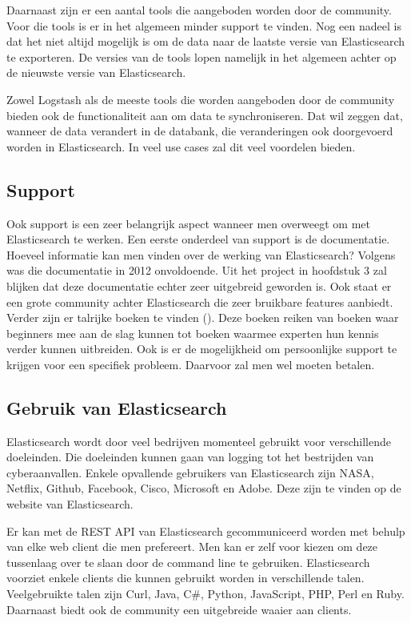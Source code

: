 Daarnaast zijn er een aantal tools die aangeboden worden door de community. Voor die tools is er in het algemeen minder support te vinden. Nog een nadeel is dat het niet altijd mogelijk is om de data naar de laatste versie van Elasticsearch te exporteren. De versies van de tools lopen namelijk in het algemeen achter op de nieuwste versie van Elasticsearch. 

Zowel Logstash als de meeste tools die worden aangeboden door de community bieden ook de functionaliteit aan om data te synchroniseren. Dat wil zeggen dat, wanneer de data verandert in de databank, die veranderingen ook doorgevoerd worden in Elasticsearch. In veel use cases zal dit veel voordelen bieden. 

\subsection{Support}

Ook support is een zeer belangrijk aspect wanneer men overweegt om met Elasticsearch te werken. Een eerste onderdeel van support is de documentatie. Hoeveel informatie kan men vinden over de werking van Elasticsearch? Volgens \textcite{Glauner2012} was die documentatie in 2012 onvoldoende. Uit het project in hoofdstuk 3 zal blijken dat deze documentatie echter zeer uitgebreid geworden is. Ook staat er een grote community achter Elasticsearch die zeer bruikbare features aanbiedt. Verder zijn er talrijke boeken te vinden (\textcite{Turner}). Deze boeken reiken van boeken waar beginners mee aan de slag kunnen tot boeken waarmee experten hun kennis verder kunnen uitbreiden. Ook is er de mogelijkheid om persoonlijke support te krijgen voor een specifiek probleem. Daarvoor zal men wel moeten betalen.

\subsection{Gebruik van Elasticsearch}
\label{subsec:gebruikES}

Elasticsearch wordt door veel bedrijven momenteel gebruikt voor verschillende doeleinden. Die doeleinden kunnen gaan van logging tot het bestrijden van cyberaanvallen. Enkele opvallende gebruikers van Elasticsearch zijn NASA, Netflix, Github, Facebook, Cisco, Microsoft en Adobe. Deze zijn te vinden op de website van Elasticsearch.

Er kan met de REST API van Elasticsearch gecommuniceerd worden met behulp van elke web client die men prefereert. Men kan er zelf voor kiezen om deze tussenlaag over te slaan door de command line te gebruiken. Elasticsearch voorziet enkele clients die kunnen gebruikt worden in verschillende talen. Veelgebruikte talen zijn Curl, Java, C\#, Python, JavaScript, PHP, Perl en Ruby. Daarnaast biedt ook de community een uitgebreide waaier aan clients.

